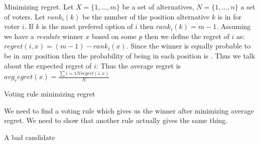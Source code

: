 \documentclass[12pt]{article}
\newenvironment{question}[2][Question]{\begin{trivlist}
\item[\hskip \labelsep {\bfseries #1}\hskip \labelsep {\bfseries #2.}]}{\end{trivlist}}
\newenvironment{answer}[2][Answer]{\begin{trivlist}
\item[\hskip \labelsep {\bfseries #1}\hskip \labelsep {\bfseries #2:}]}{\end{trivlist}}
\begin{document}
\begin{question}{3}

Minimizing regret. Let $X=\{1, ..., m \}$ be a set of alternatives, $N=\{1, ..., n \}$ a set of voters. Let $rank_i(k)$ be the number of the position alternative $k$ is in for voter $i$. If $k$ is the most prefered option of $i$ then $rank_i(k)=m-1$. Assuming we have a \textit{resulute} winner $x$ based on some $p$ then we define the regret of $i$ as: $regret(i,x)=(m-1)-rank_i(x)$. Since the winner is equally probable to be in any position then the probability of being in each position is . Thus we talk about the expected regret of $i$:  Thus the average regret is $avg_regret(x)=\frac{\sum{i =1}{N}{regret(i,x)}}{N}$
\end{question}
\begin{answer}{a)}{Voting rule minimizing regret}

We need to find a voting rule which gives us the winner after minimizing average regret. We need to show that another rule actually gives the same thing.
\end{answer}
\begin{answer}{b)}{A bad candidate}


\end{answer}
\end{document}
